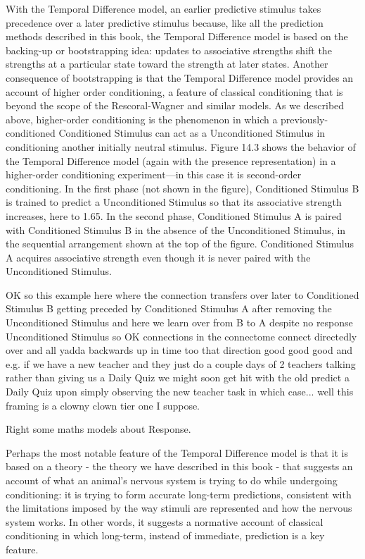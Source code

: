 With the Temporal Difference model, an earlier predictive stimulus takes precedence over a later predictive stimulus because, like all the prediction methods described in this book, the Temporal Difference model is based on the backing-up or bootstrapping idea: updates to associative strengths shift the strengths at a particular state toward the strength at later states. Another consequence of bootstrapping is that the Temporal Difference model provides an account of higher order conditioning, a feature of classical conditioning that is beyond the scope of the Rescoral-Wagner and similar models. As we described above, higher-order conditioning is the phenomenon in which a previously-conditioned Conditioned Stimulus can act as a Unconditioned Stimulus in conditioning another initially neutral stimulus. Figure 14.3 shows the behavior of the Temporal Difference model (again with the presence representation) in a higher-order conditioning experiment—in this case it is second-order conditioning. In the first phase (not shown in the figure), Conditioned Stimulus B is trained to predict a Unconditioned Stimulus so that its associative strength increases, here to 1.65. In the second phase, Conditioned Stimulus A is paired with Conditioned Stimulus B in the absence of the Unconditioned Stimulus, in the sequential arrangement shown at the top of the figure. Conditioned Stimulus A acquires associative strength even though it is never paired with the Unconditioned Stimulus.

OK so this example here where the connection transfers over later to Conditioned Stimulus B getting preceded by Conditioned Stimulus A after removing the Unconditioned Stimulus and here we learn over from B to A despite no response Unconditioned Stimulus so OK connections in the connectome connect directedly over and all yadda backwards up in time too that direction good good good and e.g. if we have a new teacher and they just do a couple days of 2 teachers talking rather than giving us a Daily Quiz we might soon get hit with the old predict a Daily Quiz upon simply observing the new teacher task in which case... well this framing is a clowny clown tier one I suppose.

Right some maths models about Response.

Perhaps the most notable feature of the Temporal Difference model is that it is based on a theory - the theory we have described in this book - that suggests an account of what an animal's nervous system is trying to do while undergoing conditioning: it is trying to form accurate long-term predictions, consistent with the limitations imposed by the way stimuli are represented and how the nervous system works. In other words, it suggests a normative account of classical conditioning in which long-term, instead of immediate, prediction is a key feature.

